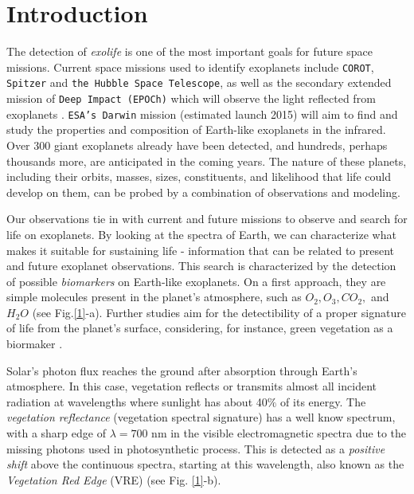 \section{Introduction}


The detection of {\it exolife} is one of the most important goals for
future space missions. Current space missions used to identify exoplanets
include \texttt{COROT}, \texttt{Spitzer} and \texttt{the Hubble Space
Telescope}, as well as the secondary extended mission of \texttt{Deep Impact
(EPOCh)} which will observe the light reflected from exoplanets
\cite{arnold_etal07}. \texttt{ESA’s Darwin} mission (estimated launch 2015)
will aim to find and study the properties and composition of Earth-like
exoplanets in the infrared. Over 300 giant exoplanets already have been
detected, and hundreds, perhaps thousands more, are anticipated in the coming
years. The nature of these planets, including their orbits, masses, sizes,
constituents, and likelihood that life could develop on them, can be probed by a
combination of observations and modeling.

Our observations tie in with current and future missions to observe and
search for life on exoplanets. By looking at the spectra of Earth, we can
characterize what makes it suitable for sustaining life - information that can
be related to present and future exoplanet observations. This search is
characterized by the detection of possible {\it biomarkers} on Earth-like
exoplanets. On a first approach, they are simple molecules present in the
planet's atmosphere, such as $O_2, O_3, CO_2,$ and $H_2O$ (see Fig.\ref{1}-a).
Further studies aim for the detectibility of a proper signature of life from
the planet's surface, considering, for instance, green vegetation as a biormaker
\citep{seager_etal05}.


Solar's photon flux reaches the ground after absorption through Earth's
atmosphere. In this case, vegetation reflects or transmits almost all
incident radiation at
wavelengths where sunlight has about 40$\%$ of its energy. The {\it vegetation
reflectance} (vegetation spectral signature) has a well know
spectrum, with a sharp edge of $\lambda =  700$ nm in the visible
electromagnetic spectra due to the missing photons used in photosynthetic
process. This is detected as a {\it positive shift} above the continuous
spectra, starting at
this wavelength, also known as the {\it Vegetation Red Edge} (VRE) (see
Fig. \ref{1}-b).


